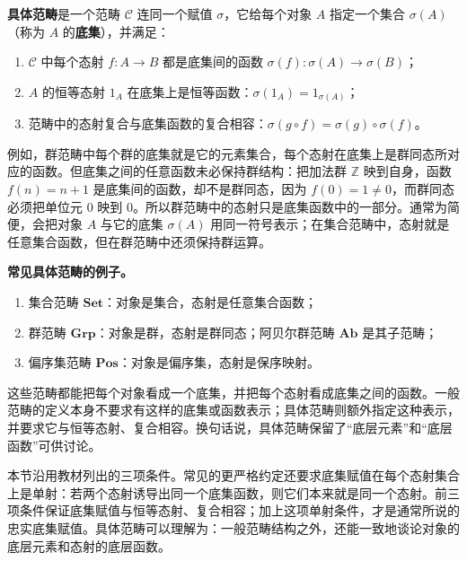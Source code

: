 \begin{definition}[具体范畴]\label{def:concrete-category}
\textbf{具体范畴}是一个范畴 $\mathcal C$ 连同一个赋值 $\sigma$，它给每个对象 $A$ 指定一个集合 $\sigma(A)$（称为 $A$ 的\textbf{底集}），并满足：
\begin{enumerate}[label=(\arabic*)]
  \item $\mathcal C$ 中每个态射 $f:A\to B$ 都是底集间的函数 $\sigma(f):\sigma(A)\to\sigma(B)$；
  \item $A$ 的恒等态射 $1_A$ 在底集上是恒等函数：$\sigma(1_A)=1_{\sigma(A)}$；
  \item 范畴中的态射复合与底集函数的复合相容：$\sigma(g\circ f)=\sigma(g)\circ\sigma(f)$。
\end{enumerate}
\end{definition}

\begin{purplenote}
例如，群范畴中每个群的底集就是它的元素集合，每个态射在底集上是群同态所对应的函数。但底集之间的任意函数未必保持群结构：把加法群 $\mathbb Z$ 映到自身，函数 $f(n)=n+1$ 是底集间的函数，却不是群同态，因为 $f(0)=1\neq0$，而群同态必须把单位元 $0$ 映到 $0$。所以群范畴中的态射只是底集函数中的一部分。通常为简便，会把对象 $A$ 与它的底集 $\sigma(A)$ 用同一符号表示；在集合范畴中，态射就是任意集合函数，但在群范畴中还须保持群运算。
\end{purplenote}

\begin{purplenote}
\textbf{常见具体范畴的例子。}
\begin{enumerate}[label=(\arabic*)]
  \item 集合范畴 $\mathbf{Set}$：对象是集合，态射是任意集合函数；
  \item 群范畴 $\mathbf{Grp}$：对象是群，态射是群同态；阿贝尔群范畴 $\mathbf{Ab}$ 是其子范畴；
  \item 偏序集范畴 $\mathbf{Pos}$：对象是偏序集，态射是保序映射。
\end{enumerate}
这些范畴都能把每个对象看成一个底集，并把每个态射看成底集之间的函数。一般范畴的定义本身不要求有这样的底集或函数表示；具体范畴则额外指定这种表示，并要求它与恒等态射、复合相容。换句话说，具体范畴保留了“底层元素”和“底层函数”可供讨论。

本节沿用教材列出的三项条件。常见的更严格约定还要求底集赋值在每个态射集合上是单射：若两个态射诱导出同一个底集函数，则它们本来就是同一个态射。前三项条件保证底集赋值与恒等态射、复合相容；加上这项单射条件，才是通常所说的忠实底集赋值。具体范畴可以理解为：一般范畴结构之外，还能一致地谈论对象的底层元素和态射的底层函数。
\end{purplenote}

